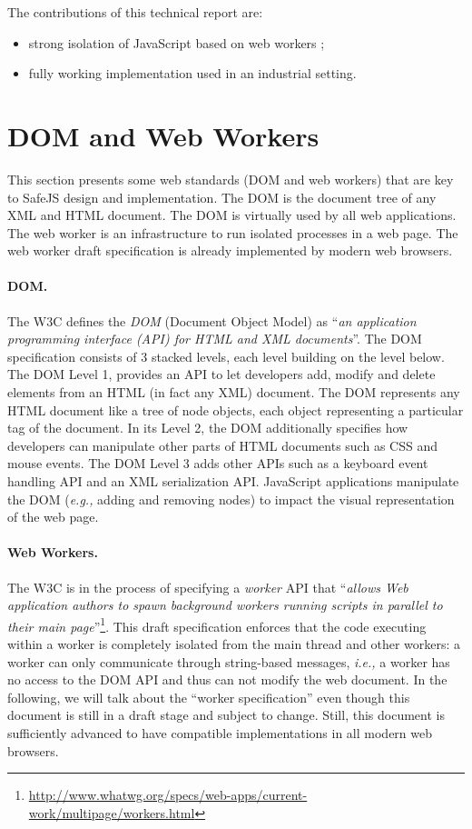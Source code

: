 \documentclass{article}
\newcommand{\eg}{\emph{e.g.,}\xspace}
\newcommand{\ie}{\emph{i.e.,}\xspace}
\newcommand{\js}{JavaScript\xspace}
\newcommand{\safejs}{SafeJS\xspace}
\newcommand{\dom}{DOM\xspace}
\begin{document}
The contributions of this technical report are:

\begin{itemize}
\item strong isolation of \js based on web workers ;
\item fully working implementation used in an industrial setting.
\end{itemize}

\section{DOM and Web Workers}

This section presents some web standards (\dom and web workers) that
are key to \safejs design and implementation. The \dom is the document
tree of any XML and HTML document. The DOM is virtually used by all
web applications. The web worker is an infrastructure to run isolated
processes in a web page. The web worker draft specification is already
implemented by modern web browsers.


\paragraph{\dom.} The W3C defines the \emph{\dom} (Document Object
Model) as ``\emph{an application programming interface (API) for HTML
  and XML documents}''\cite{DOM98}. The \dom specification consists of
3 stacked levels, each level building on the level below. The \dom
Level 1, provides an API to let developers add, modify and delete
elements from an HTML (in fact any XML) document. The \dom represents
any HTML document like a tree of node objects, each object
representing a particular tag of the document. In its Level 2, the
\dom additionally specifies how developers can manipulate other parts
of HTML documents such as CSS and mouse events. The \dom Level 3 adds
other APIs such as a keyboard event handling API and an XML
serialization API. \js applications manipulate the DOM (\eg adding and
removing nodes) to impact the visual representation of the web page.

\paragraph{Web Workers.} The W3C is in the process of specifying a
\emph{worker} API that ``\emph{allows Web application authors to spawn
  background workers running scripts in parallel to their main
  page}''\footnote{\url{http://www.whatwg.org/specs/web-apps/current-work/multipage/workers.html}}.
This draft specification enforces that the code executing within a
worker is completely isolated from the main thread and other workers:
a worker can only communicate through string-based messages, \ie a
worker has no access to the \dom API and thus can not modify the web
document. In the following, we will talk about the ``worker
specification'' even though this document is still in a draft stage
and subject to change. Still, this document is sufficiently advanced
to have compatible implementations in all modern web browsers.
\end{document}
